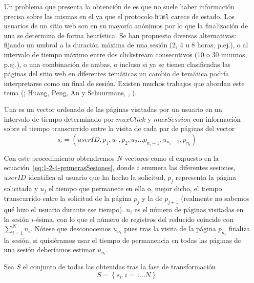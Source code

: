 Un problema que presenta la obtención de \sns es que no suele haber información precisa sobre las mismas en el \flog ya que el protocolo \texttt{html} carece de estado. Los usuarios de un sitio web son en su mayoría anónimos por lo que la finalización de una \sn se determina de forma heurística. Se han propuesto diversas alternativas: fijando un umbral a la duración máxima de una sesión (2, 4 u 8 horas, p.ej.), o al intervalo de tiempo máximo entre dos clickstream consecutivos (10 o 30 minutos, p.ej.), o una combinación de ambas, o incluso si ya se tienen clasificadas las páginas del sitio web en diferentes temáticas un cambio de temática podría interpretarse como un final de sesión. Existen muchos trabajos que abordan este tema (\cite{HeGoker-DetectingSessionBoundaries-2000,HuangPengAnSchuurmansCercone-SessionBoundaryDetection-2003}; Huang, Peng, An y Schuurmans, \cite*{HuangPengAnSchuurmans-DynamicWebLogSessionBoundaryDetection-2004}, \cite*{HuangPengAnSchuurmans-DynamicWebLogSessionIdentification-2004}).

\begin{Definition}[\Sn]\label{def:1-2-4-sesion}
  Una \sn es un vector ordenado de las páginas visitadas por un usuario en un intervalo de tiempo determinado por $maxClick$ y $maxSession$ con información sobre el tiempo transcurrido entre la visita de cada par de páginas del vector
  \begin{equation}\label{eq:1-2-4-primerasSesiones}
    s_i = \left({userID}, p_1, u_1, p_2, u_2\ldots p_{n_i-1}, u_{n_i-1}, p_{n_i}\right)
  \end{equation}
\end{Definition}

Con este procedimiento obtendremos $N$ vectores como el expuesto en la ecuación~\ref{eq:1-2-4-primerasSesiones}, donde $i$ enumera las diferentes sesiones, $userID$ identifica al usuario que ha hecho la solicitud, $p_j$ representa la página solicitada y $u_j$ el tiempo que permanece en ella o, mejor dicho, el tiempo transcurrido entre la solicitud de la página $p_j$ y la de $p_{j+1}$ (realmente no sabemos qué hizo el usuario durante ese tiempo). $n_i$ es el número de páginas visitadas en la sesión $i$-ésima, con lo que el número de registros del \flog reducido coincide con $\sum_{i=1}^N{n_i}$. Nótese que desconocemos $u_{n_i}$ pues tras la visita de la página $p_{n_i}$ finaliza la sesión, si quisiéramos usar el tiempo de permanencia en todas las páginas de una sesión deberíamos estimar $u_{n_i}$.

\begin{Definition}\label{def:1-2-4-cjto-sesion}
  Sea $S$ el conjunto de todas las \sns obtenidas tras la fase de transformación
  \begin{equation}\label{eq:1-2-4-cjto-sesiones}
    S = \left\{s_i, i = 1\ldots N\right\}
  \end{equation}
\end{Definition}

